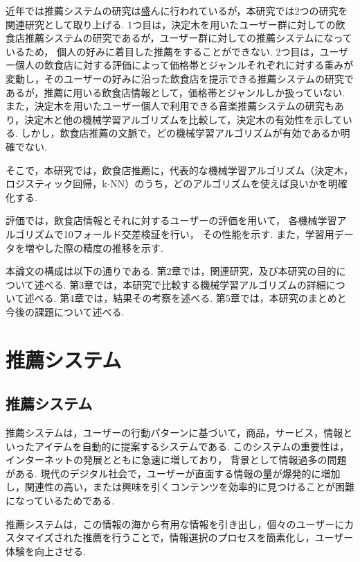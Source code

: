 \documentclass[12pt,a4j]{jreport}
\begin{document}
近年では推薦システムの研究は盛んに行われているが，本研究では2つの研究を関連研究として取り上げる.
1つ目は，決定木を用いたユーザー群に対しての飲食店推薦システムの研究\cite{a}であるが，ユーザー群に対しての推薦システムになっているため， 個人の好みに着目した推薦をすることができない.
2つ目は，ユーザー個人の飲食店に対する評価によって価格帯とジャンルそれぞれに対する重みが変動し，そのユーザーの好みに沿った飲食店を提示できる推薦システムの研究\cite{b}であるが，推薦に用いる飲食店情報として，価格帯とジャンルしか扱っていない.
また，決定木を用いたユーザー個人で利用できる音楽推薦システムの研究\cite{c}もあり，決定木と他の機械学習アルゴリズムを比較して，決定木の有効性を示している.
しかし，飲食店推薦の文脈で，どの機械学習アルゴリズムが有効であるか明確でない.

そこで，本研究では，飲食店推薦に，代表的な機械学習アルゴリズム（決定木，ロジスティック回帰，k-NN）のうち，どのアルゴリズムを使えば良いかを明確化する.

評価では，飲食店情報とそれに対するユーザーの評価を用いて， 各機械学習アルゴリズムで10フォールド交差検証を行い， その性能を示す.
また，学習用データを増やした際の精度の推移を示す.

本論文の構成は以下の通りである.
第2章では，関連研究，及び本研究の目的について述べる.
第3章では，本研究で比較する機械学習アルゴリズムの詳細について述べる.
第4章では，結果その考察を述べる.
第5章では，本研究のまとめと今後の課題について述べる.


\chapter{推薦システム}

\section{推薦システム}

推薦システム\cite{d}は，ユーザーの行動パターンに基づいて，商品，サービス，情報といったアイテムを自動的に提案するシステムである.
このシステムの重要性は，インターネットの発展とともに急速に増しており， 背景として情報過多の問題がある.
現代のデジタル社会で，ユーザーが直面する情報の量が爆発的に増加し，関連性の高い，または興味を引くコンテンツを効率的に見つけることが困難になっているためである.

推薦システムは，この情報の海から有用な情報を引き出し，個々のユーザーにカスタマイズされた推薦を行うことで，情報選択のプロセスを簡素化し，ユーザー体験を向上させる.
\end{document}
